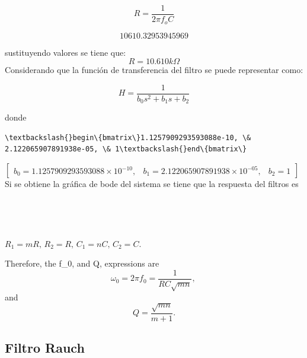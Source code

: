 \documentclass{article}
\begin{document}
\[
R=\frac{1}{2\pi f_{o} C}
\]


    
    
        \begin{equation*}
        10610.32953945969
        \end{equation*}

    

    sustituyendo valores se tiene que: \[
R=10.610k\Omega
\] Considerando que la función de transferencia del filtro se puede
representar como:

\begin{equation}
H=\frac{1}{b_{0}s^{2}+b_{1}s+b_{2}}
\end{equation}

donde


    \begin{Verbatim}[commandchars=\\\{\}]
\textbackslash{}begin\{bmatrix\}1.1257909293593088e-10, \& 2.122065907891938e-05, \& 1\textbackslash{}end\{bmatrix\}
    \end{Verbatim}
$
    \begin{bmatrix}b_{0}=1.1257909293593088\times10^{-10}, & b_{1}=2.122065907891938\times10^{-05}, & b_{2}=1\end{bmatrix}
$
Si se obtiene la gráfica de bode del sistema se tiene que la respuesta
del filtros es


    \begin{center}
    \end{center}
    { \hspace*{\fill} \\}
    


    \begin{center}
    \end{center}
    { \hspace*{\fill} \\}
    
    $R_1=mR,\,R_2=R,\,C_1=nC,\,C_2=C.\, $

Therefore, the f\_0, and Q, expressions are \[
\omega_0 = 2 \pi f_0 = \frac{1}{RC\sqrt{mn}},\, 
\] and \[
Q = \frac{\sqrt{mn}}{m+1}. 
\]

    \subsection{Filtro Rauch}\label{filtro-rauch}
\end{document}

